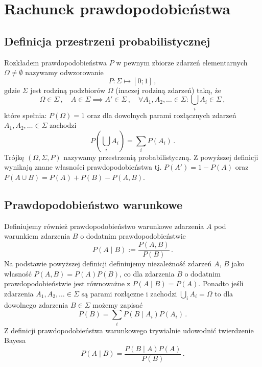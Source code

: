 \documentclass{myclass}
\author{Bartosz Hanc}
\begin{document}
\tableofcontents
\newpage

\section{Rachunek prawdopodobieństwa}

\subsection{Definicja przestrzeni probabilistycznej}

Rozkładem prawdopodobieństwa \(P\) w pewnym zbiorze zdarzeń elementarnych \(\Omega \neq \emptyset\)
nazywamy odwzorowanie
\begin{equation*}
    P: \Sigma \mapsto [0;1]\,,
\end{equation*}
gdzie \(\Sigma\) jest rodziną podzbiorów \(\Omega\) (inaczej rodziną zdarzeń) taką, że
\begin{equation*}
    \Omega \in \Sigma\,,\quad A \in \Sigma \implies A' \in \Sigma\,,\quad \forall A_1, A_2, \ldots \in \Sigma : \bigcup_{i}
    A_i \in \Sigma\,,
\end{equation*}
które spełnia: \(P(\Omega) = 1\) oraz dla dowolnych parami rozłącznych zdarzeń \(A_1, A_2, \ldots
\in \Sigma\) zachodzi
\begin{equation*}
    P\left(\bigcup_i A_i\right) = \sum_i P(A_i)\,.
\end{equation*}
Trójkę \((\Omega, \Sigma, P)\) nazywamy przestrzenią probabilistyczną. Z powyższej definicji
wynikają znane własności prawdopodobieństwa tj. \(P(A') = 1 - P(A)\) oraz \(P(A \cup B) = P(A) +
P(B) - P(A , B)\). 

\subsection{Prawdopodobieństwo warunkowe}

Definiujemy również prawdopodobieństwo warunkowe zdarzenia \(A\) pod warunkiem zdarzenia \(B\) o
dodatnim prawdopodobieństwie 
\begin{equation*}
    P(A \mid B) := \frac{P(A , B)}{P(B)}\,.
\end{equation*}
Na podstawie powyższej definicji definiujemy niezależność zdarzeń \(A\), \(B\) jako własność
\(P(A,B) = P(A)P(B)\), co dla zdarzenia \(B\) o dodatnim prawdopodobieństwie jest równoważne z \(P(A
\mid B) = P(A)\). Ponadto jeśli zdarzenia \(A_1, A_2, \ldots \in \Sigma\) są parami rozłączne i
zachodzi \(\bigcup_i A_i = \Omega\) to dla dowolnego zdarzenia \(B \in \Sigma\) możemy zapisać
\begin{equation*}
    P(B) = \sum_i P(B \mid A_i) P(A_i)\,.
\end{equation*}
Z definicji prawdopodobieństwa warunkowego trywialnie udowodnić twierdzenie Bayesa
\begin{equation*}
    P(A \mid B) = \frac{P(B \mid A) P(A)}{P(B)}\,.
\end{equation*}
\end{document}
